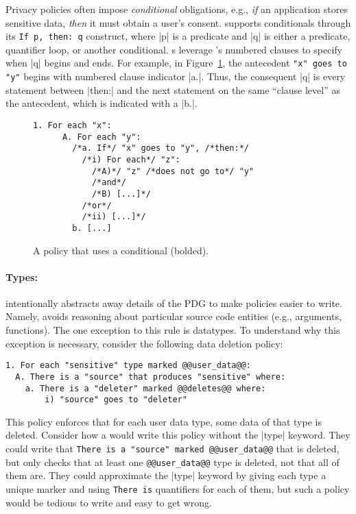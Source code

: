 Privacy policies often impose \emph{conditional} obligations, e.g.,
\emph{if} an application stores sensitive data, \emph{then} it must obtain a user's consent.
%
\syslang{} supports conditionals through its \lstinline[language=CNL]|If p, then: q| construct,
where |p| is a predicate and |q| is either a predicate, quantifier loop, or another conditional.
%
\Ce{}s leverage \syslang{}'s numbered clauses to specify when |q| begins and ends.
%
For example, in Figure~\ref{f:conditional}, the antecedent \lstinline[language=CNL]|"x" goes to "y"| begins with numbered clause indicator |a.|.
%
Thus, the consequent |q| is every statement between |then:| and the next statement on the same ``clause level'' as the antecedent,
which is indicated with a |b.|.

\begin{figure}[h]
  \begin{lstlisting}[language=CNL]
    1. For each "x":
      A. For each "y":
        /*a. If*/ "x" goes to "y", /*then:*/
          /*i) For each*/ "z":
            /*A)*/ "z" /*does not go to*/ "y"
            /*and*/
            /*B) [...]*/
          /*or*/
          /*ii) [...]*/
        b. [...]
    \end{lstlisting}
\caption{
  A \syslang{} policy that uses a conditional (bolded).
}
\label{f:conditional}
\end{figure}


\paragraph{Types:}
\syslang{} intentionally abstracts away details of the PDG to make policies easier to write.
%
Namely, \syslang{} avoids reasoning about particular source code entities (e.g., arguments, functions).
%
The one exception to this rule is datatypes.
%
To understand why this exception is necessary, consider the following data deletion policy:
\begin{lstlisting}[language=CNL]
1. For each "sensitive" type marked @@user_data@@:
  A. There is a "source" that produces "sensitive" where:
    a. There is a "deleter" marked @@deletes@@ where:
        i) "source" goes to "deleter"
\end{lstlisting}
%
This policy enforces that for each user data type, some data of that type is deleted.
%
Consider how a \ce{} would write this policy without the |type| keyword.
%
They could write that \lstinline[language=CNL]|There is a "source" marked @@user_data@@| that is deleted,
but only checks that at least one \lstinline[language=CNL]|@@user_data@@| type is deleted, not that all of them are.
%
They could approximate the |type| keyword by giving each type a unique marker and using \lstinline[language=CNL]|There is|
quantifiers for each of them, but such a policy would be tedious to write and easy to get wrong.


